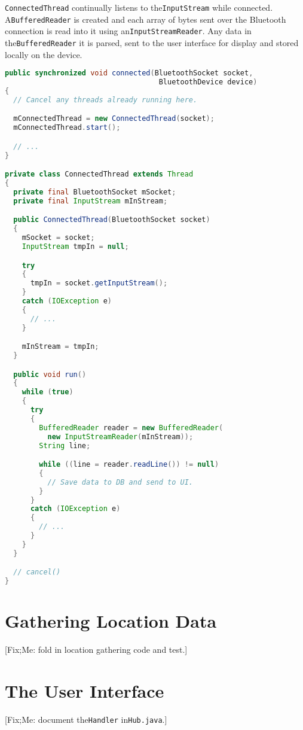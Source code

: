 \documentclass[11pt, a4paper, oneside, english]{scrbook}
\begin{document}
\lstinline{ConnectedThread} continually listens to the\lstinline{InputStream} while connected. A\lstinline{BufferedReader} is created and each array of bytes sent over the Bluetooth connection is read into it using an\lstinline{InputStreamReader}. Any data in the\lstinline{BufferedReader} it is parsed, sent to the user interface for display and stored locally on the device.
\begin{lstlisting}[language=Java, numbers=none]
public synchronized void connected(BluetoothSocket socket,
                                    BluetoothDevice device)
{ 
  // Cancel any threads already running here.

  mConnectedThread = new ConnectedThread(socket);
  mConnectedThread.start();

  // ...
}

private class ConnectedThread extends Thread
{
  private final BluetoothSocket mSocket;
  private final InputStream mInStream;  

  public ConnectedThread(BluetoothSocket socket)
  {
    mSocket = socket;
    InputStream tmpIn = null;  

    try
    {
      tmpIn = socket.getInputStream();
    }
    catch (IOException e)
    {
      // ...
    }  

    mInStream = tmpIn;
  }

  public void run()
  {
    while (true)
    {
      try
      {
        BufferedReader reader = new BufferedReader(
          new InputStreamReader(mInStream));
        String line;  

        while ((line = reader.readLine()) != null)
        {
          // Save data to DB and send to UI.
        }
      }
      catch (IOException e)
      {
        // ...
      }
    }
  }

  // cancel()
}
\end{lstlisting}
\section{Gathering Location Data} %
\label{sec:gathering_location_data}
[Fix;Me: fold in location gathering code and test.]
\section{The User Interface} %
\label{sec:the_user_interface}
[Fix;Me: document the\lstinline{Handler} in\lstinline{Hub.java}.]
\end{document}
